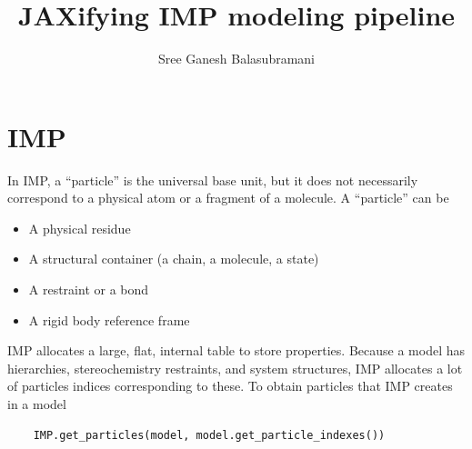 \documentclass[]{article}
\title{JAXifying IMP modeling pipeline}
\author{Sree Ganesh Balasubramani}
\begin{document}
\maketitle
\section{IMP}
In IMP, a ``particle'' is the universal base unit, but it does not necessarily
correspond to a physical atom or a fragment of a molecule. A ``particle'' can be 
\begin{itemize}
    \item A physical residue
    \item A structural container (a chain, a molecule, a state)
    \item A restraint or a bond
    \item A rigid body reference frame
\end{itemize}
IMP allocates a large, flat, internal table to store properties. Because a model has 
hierarchies, stereochemistry restraints, and system structures, IMP allocates a lot of 
particles indices corresponding to these.  
To obtain particles that IMP creates in a model 
\begin{verbatim}
    IMP.get_particles(model, model.get_particle_indexes())
\end{verbatim}
\end{document}
